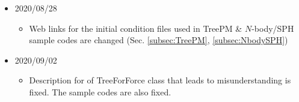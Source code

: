 \begin{itemize}
\item 2020/08/28
\begin{itemize}
\item Web links for the initial condition files used in TreePM \& $N$-body/SPH sample codes are changed (Sec. \ref{subsec:TreePM}, \ref{subsec:NbodySPH})
\end{itemize}

\item 2020/09/02
\begin{itemize}
\item Description for \initTree of TreeForForce class that leads to misunderstanding is fixed. The sample codes are also fixed.
\end{itemize}

\end{itemize} 

